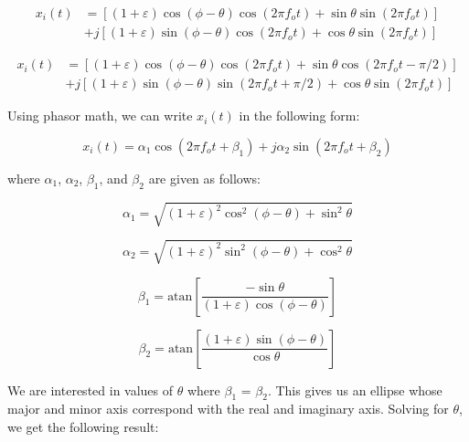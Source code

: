 \documentclass{article}
\begin{document}
\begin{equation}
\begin{split}
	x_i(t) &= \left[(1+\varepsilon)\cos(\phi-\theta)\cos(2{\pi}f_ot)+\sin\theta\sin(2{\pi}f_ot)\right]\\
	&+j\left[(1+\varepsilon)\sin(\phi-\theta)\cos(2{\pi}f_ot)+\cos\theta\sin(2{\pi}f_ot)\right]
\end{split}
\end{equation}

\begin{equation}
\begin{split}
	x_i(t) &= \left[(1+\varepsilon)\cos(\phi-\theta)\cos(2{\pi}f_ot)+\sin\theta\cos(2{\pi}f_ot-\pi/2)\right]\\
	&+j\left[(1+\varepsilon)\sin(\phi-\theta)\sin(2{\pi}f_ot+\pi/2)+\cos\theta\sin(2{\pi}f_ot)\right]
\end{split}
\end{equation}

Using phasor math, we can write $x_i(t)$ in the following form:

\begin{equation}
	x_i(t) = \alpha_1\cos(2{\pi}f_ot+\beta_1)+j\alpha_2\sin(2{\pi}f_ot+\beta_2)
\end{equation}

where $\alpha_1$, $\alpha_2$, $\beta_1$, and $\beta_2$ are given as follows:

\begin{equation}
	\alpha_1 = \sqrt{(1+\varepsilon)^2\cos^2(\phi-\theta)+\sin^2\theta}
\end{equation}

\begin{equation}
	\alpha_2 = \sqrt{(1+\varepsilon)^2\sin^2(\phi-\theta)+\cos^2\theta}
\end{equation}

\begin{equation}
	\beta_1 = \text{atan}\left[\frac{-\sin\theta}{(1+\varepsilon)\cos(\phi-\theta)}\right]
\end{equation}

\begin{equation}
	\beta_2 = \text{atan}\left[\frac{(1+\varepsilon)\sin(\phi-\theta)}{\cos\theta}\right]
\end{equation}

We are interested in values of $\theta$ where $\beta_1$ = $\beta_2$. This gives us an ellipse whose major and minor axis correspond with the real and imaginary axis. Solving for $\theta$, we get the following result:
\end{document}
